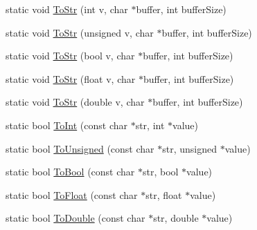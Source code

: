 \begin{DoxyCompactItemize}
\item 
static void \hyperlink{classtinyxml2_1_1_x_m_l_util_a3cd6c703d49b9d51bdf0f4ff6aa021c7}{To\-Str} (int v, char $\ast$buffer, int buffer\-Size)
\item 
static void \hyperlink{classtinyxml2_1_1_x_m_l_util_ac00c2e52c1c36dab3ff41d86a9bf60f9}{To\-Str} (unsigned v, char $\ast$buffer, int buffer\-Size)
\item 
static void \hyperlink{classtinyxml2_1_1_x_m_l_util_adba0718527ae9e80f663a71ea325cb11}{To\-Str} (bool v, char $\ast$buffer, int buffer\-Size)
\item 
static void \hyperlink{classtinyxml2_1_1_x_m_l_util_a8957ad44fee5fa02ba52d73aad4d0a31}{To\-Str} (float v, char $\ast$buffer, int buffer\-Size)
\item 
static void \hyperlink{classtinyxml2_1_1_x_m_l_util_a1cd141e50980fcddd6bf9af5de4b1db7}{To\-Str} (double v, char $\ast$buffer, int buffer\-Size)
\item 
static bool \hyperlink{classtinyxml2_1_1_x_m_l_util_ad4df4023d11ee3fca9689c49b9707323}{To\-Int} (const char $\ast$str, int $\ast$value)
\item 
static bool \hyperlink{classtinyxml2_1_1_x_m_l_util_a210c8637d5eb4ce3d4625294af0efc2f}{To\-Unsigned} (const char $\ast$str, unsigned $\ast$value)
\item 
static bool \hyperlink{classtinyxml2_1_1_x_m_l_util_ae5b03e0a1ca5d42052a7ac540f7aa12a}{To\-Bool} (const char $\ast$str, bool $\ast$value)
\item 
static bool \hyperlink{classtinyxml2_1_1_x_m_l_util_a399e71edb5f29d61ea81d91ee0332bb9}{To\-Float} (const char $\ast$str, float $\ast$value)
\item 
static bool \hyperlink{classtinyxml2_1_1_x_m_l_util_ad8f75ac140fb19c1c6e164a957c4cd53}{To\-Double} (const char $\ast$str, double $\ast$value)
\end{DoxyCompactItemize}


